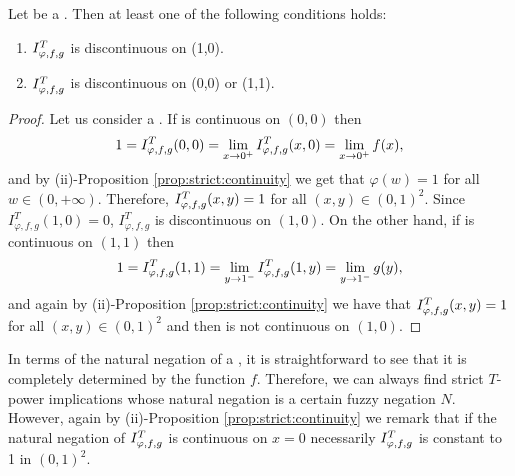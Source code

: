 \begin{corollary}\label{cor:strict:discontinuous} Let \IT be a \STP. Then at least one of the following conditions holds:
	\begin{enumerate}[label=(\roman*)]
		\item $I^T_{\varphi,f,g}$ is discontinuous on (1,0).
		\item $I^T_{\varphi,f,g}$ is discontinuous on (0,0) or (1,1).
	\end{enumerate}
\end{corollary}
\begin{proof} Let us consider \IT a \STP. If \IT is continuous on $(0,0)$ then
	$$ 1=I^T_{\varphi,f,g}(0,0)= \lim_{x \to 0^+} I^T_{\varphi,f,g}(x,0) = \lim_{x \to 0^+} f(x), $$
	and by {(ii)-Proposition \ref{prop:strict:continuity}} we get that $\varphi(w)=1$ for all $w \in (0,+\infty)$. Therefore, $I^T_{\varphi,f,g}(x,y)=1$ for all $(x,y) \in (0,1)^2$. Since $I^T_{\varphi,f,g}(1,0)=0$, $I^T_{\varphi,f,g}$ is discontinuous on $(1,0)$.
	On the other hand, if \IT is continuous on $(1,1)$ then
	$$1=I^T_{\varphi,f,g}(1,1)= \lim_{y \to 1^-} I^T_{\varphi,f,g}(1,y) = \lim_{y \to 1^-} g(y), $$
	and again by {(ii)-Proposition \ref{prop:strict:continuity}} we have that $I^T_{\varphi,f,g}(x,y)=1$ for all $(x,y) \in (0,1)^2$ and then \IT is not continuous on $(1,0)$.
\end{proof}
In terms of the natural negation of a \STP, it is straightforward to see that it is completely determined by the function $f$. Therefore, we can always find strict $T$-power implications  whose natural negation is a certain fuzzy negation $N$. However, again by {(ii)-Proposition \ref{prop:strict:continuity}} we remark that if the natural negation of $I^T_{\varphi,f,g}$ is continuous on $x=0$ necessarily $I^T_{\varphi,f,g}$ is constant to 1 in $(0,1)^2$.

